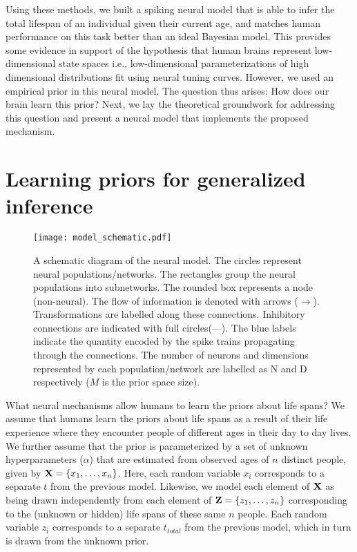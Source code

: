 \documentclass[10pt,letterpaper]{article}
\renewcommand{\vec}[1]{{\bf {#1}}}
\begin{document}

Using these methods, we built a spiking neural model that is able to infer the total lifespan of an individual given their current age, and matches human performance on this task better than an ideal Bayesian model. This provides some evidence in support of the hypothesis that human brains represent low-dimensional
state spaces i.e., low-dimensional parameterizations of high dimensional
distributions fit using neural tuning curves. However, we used an empirical prior in this neural model. The question thus arises: How does our brain learn this prior? Next, we lay the theoretical groundwork for addressing this question and present a neural model that implements the proposed mechanism.

\section{Learning priors for generalized inference}

\begin{figure*}[ht]
\setlength{\belowcaptionskip}{-10pt}
\begin{center}
\texttt{[image: model\_schematic.pdf]}
\end{center}
\caption{A schematic diagram of the neural model. The circles represent neural populations/networks. The rectangles group the neural populations into subnetworks. The rounded box represents a node (non-neural).  The flow of information is denoted with arrows ($\rightarrow$). Transformations are labelled along these connections. Inhibitory connections are indicated with full circles(---\textbullet). The blue labels indicate the quantity encoded by the spike trains propagating through the connections. The number of neurons and dimensions represented by each population/network are labelled as N and D respectively ($M$ is the prior space size).} 
\label{fig:model_schematic}
\end{figure*}


What neural mechanisms allow humans to learn the priors about life spans? We assume that humans learn the priors about life spans as a result of their life experience where they encounter people of different ages in their day to day lives. We further assume that the prior is parameterized by a set of unknown hyperparameters ($\alpha$) that are estimated from observed ages of $n$ distinct people, given by $\vec{X} = \{x_1, \ldots, x_n\}$. Here, each random variable $x_i$ corresponds to a separate $t$ from the previous model. Likewise, we model each element of $\vec{X}$ as being drawn independently from each element of $\vec{Z} = \{z_1, \ldots, z_n\}$ corresponding to the (unknown or hidden) life spans of these same $n$ people. Each random variable $z_i$ corresponds to a separate $t_{total}$ from the previous model, which in turn is drawn from the unknown prior. 
\end{document}
